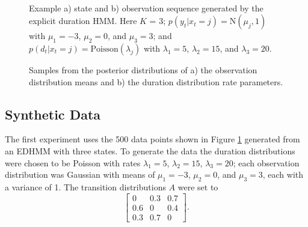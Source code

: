 
\begin{figure}
     \\
    \caption{Example a) state and b) observation sequence generated by the explicit duration HMM. Here $K$ = 3; $p(y_t|x_t=j) = \mathrm{N}(\mu_j, 1)$ with $\mu_1 = -3$, $\mu_2 = 0$, and $\mu_3 = 3$; and $p(d_t|x_t=j) = \mathrm{Poisson}(\lambda_j)$ with $\lambda_1 = 5$, $\lambda_2 = 15$, and $\lambda_3 = 20$.}
    \label{fig:experiment1_data}
\end{figure}

\begin{figure}
    \caption{Samples from the posterior distributions of a) the observation distribution means and b) the duration distribution rate parameters.}
    \label{fig:experiment1_results}
\end{figure}
\subsection{Synthetic Data}

The first experiment uses the 500 data points shown in Figure \ref{fig:experiment1_data} generated from an EDHMM with three states. To generate the data the duration distributions were chosen to be Poisson with rates $\lambda_1 = 5$, $\lambda_2 = 15$, $\lambda_3 = 20$; each observation distribution was Gaussian with means of $\mu_1 = -3$, $\mu_2 = 0$, and $\mu_3 = 3$, each with a variance of 1. The transition distributions $A$ were set to
\begin{equation*}
\begin{bmatrix}
    0 & 0.3 & 0.7 \\ 0.6 & 0 & 0.4 \\ 0.3 & 0.7 & 0
\end{bmatrix}.  
\end{equation*}




